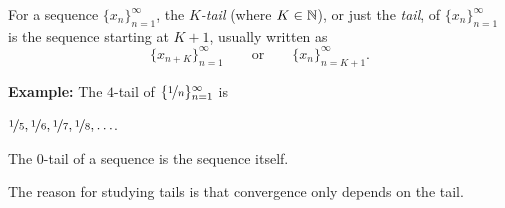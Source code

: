 \documentclass[10pt,aspectratio=169]{beamer}
\begin{document}
\begin{frame}

\begin{definition}
For a sequence $\{ x_n \}_{n=1}^\infty$,
the \emph{$K$-tail} (where $K \in {\mathbb{N}}$),
or just the
\emph{tail}, of
$\{ x_n \}_{n=1}^\infty$ is the sequence starting at $K+1$, usually written as
\begin{equation*}
\{ x_{n+K} \}_{n=1}^\infty
\qquad \text{or} \qquad \{ x_n \}_{n=K+1}^\infty .
\end{equation*}
\end{definition}

\pause

\textbf{Example:}
The $4$-tail of $\{ \nicefrac{1}{n} \}_{n=1}^\infty$ is

$\nicefrac{1}{5}, \nicefrac{1}{6}, \nicefrac{1}{7}, \nicefrac{1}{8},
\ldots$.

\medskip
\pause

The $0$-tail of a sequence is the sequence itself.

\medskip
\pause

The reason for studying tails is that convergence only depends on the tail.

\end{frame}
\end{document}
